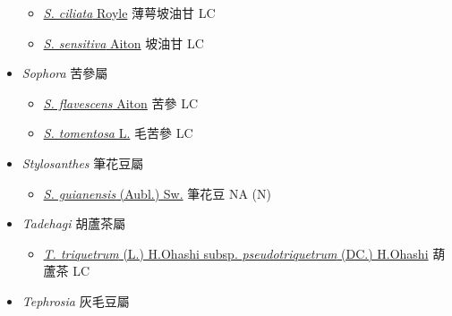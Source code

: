 \begin{itemize}
  \begin{itemize}
        \item[] \href{http://www.theplantlist.org/tpl1.1/search?q=Smithia+ciliata}{\textit{S. ciliata} Royle}   薄萼坡油甘   LC
        \item[] \href{http://www.theplantlist.org/tpl1.1/search?q=Smithia+sensitiva}{\textit{S. sensitiva} Aiton}   坡油甘   LC
  \end{itemize}
 \item[] \textit{Sophora} 苦參屬
                                
  \begin{itemize}
        \item[] \href{http://www.theplantlist.org/tpl1.1/search?q=Sophora+flavescens}{\textit{S. flavescens} Aiton}   苦參   LC
        \item[] \href{http://www.theplantlist.org/tpl1.1/search?q=Sophora+tomentosa}{\textit{S. tomentosa} L.}   毛苦參   LC
  \end{itemize}
 \item[] \textit{Stylosanthes} 筆花豆屬
                                
  \begin{itemize}
        \item[] \href{http://www.theplantlist.org/tpl1.1/search?q=Stylosanthes+guianensis}{\textit{S. guianensis} (Aubl.) Sw.}   筆花豆   NA (N)
  \end{itemize}
 \item[] \textit{Tadehagi} 胡蘆茶屬
                                
  \begin{itemize}
        \item[] \href{http://www.theplantlist.org/tpl1.1/search?q=Tadehagi+triquetrum+subsp.+pseudotriquetrum}{\textit{T. triquetrum} (L.) H.Ohashi subsp. \textit{pseudotriquetrum} (DC.) H.Ohashi}   葫蘆茶   LC
  \end{itemize}
 \item[] \textit{Tephrosia} 灰毛豆屬
                                

\end{itemize}
